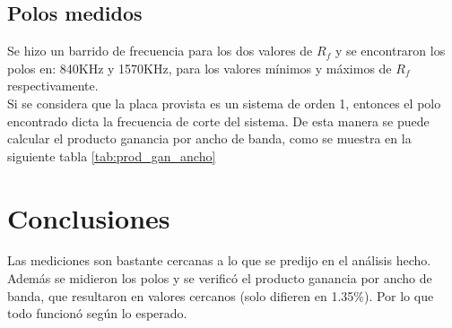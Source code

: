 \documentclass[letterpaper, 10 pt, conference]{ieeeconf}  %
\begin{document}
\subsection{Polos medidos}
Se hizo un barrido de frecuencia para los dos valores de $R_f$ y se encontraron los polos en: 840KHz y 1570KHz, para los valores mínimos y máximos de $R_f$ respectivamente.
\\
Si se considera que la placa provista es un sistema de orden 1, entonces el polo encontrado dicta la frecuencia de corte del sistema. De esta manera se puede calcular el producto ganancia por ancho de banda, como se muestra en la siguiente tabla \ref{tab:prod_gan_ancho}

\begin{table}[H]
  \centering
  \caption{Producto ganancia por ancho de banda}
  \label{tab:prod_gan_ancho}
\end{table}

\section{Conclusiones}
Las mediciones son bastante cercanas a lo que se predijo en el análisis hecho. Además se midieron los polos y se verificó el producto ganancia por ancho de banda, que resultaron en valores cercanos (solo difieren en 1.35\%). Por lo que todo funcionó según lo esperado.
\end{document}
